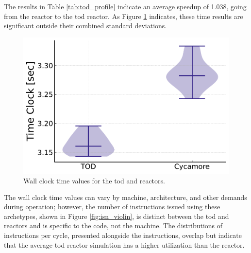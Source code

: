 The results in Table \ref{tab:tod_profile} indicate an average speedup of 1.038, going from the \cycamore reactor to the \gls{tod} reactor. As Figure \ref{fig:time_violin} indicates, these time results are significant outside their combined standard deviations.

\begin{figure}[H]
    \centering
    \includegraphics[width=0.7\linewidth]{images/power_reactor/time_clock_violin.pdf}
    \caption{Wall clock time values for the \gls{tod} and \cycamore reactors.}
    \label{fig:time_violin}
\end{figure}

The wall clock time values can vary by machine, architecture, and other demands during operation; however, the number of instructions issued using these archetypes, shown in Figure \ref{fig:isn_violin}, is distinct between the \gls{tod} and \cycamore reactors and is specific to the code, not the machine. The distributions of instructions per cycle, presented alongside the instructions, overlap but indicate that the average \gls{tod} reactor simulation has a higher utilization than the \cycamore reactor.

